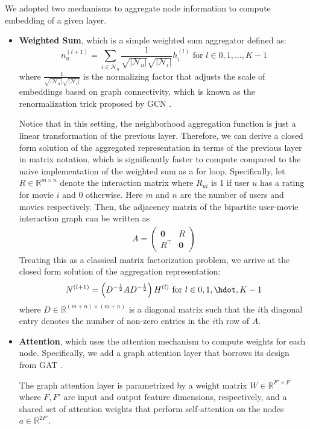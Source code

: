 \documentclass{article}
\begin{document}
We adopted two mechanisms to aggregate node information to compute embedding of a given layer. 
\begin{itemize}
    \item \textbf{Weighted Sum}, which is a simple weighted sum aggregator defined as: $$n_u^{(l+1)}=\sum_{i\in \mathcal{N}_u} \frac{1}{\sqrt{|\mathcal{N}_u|} \sqrt{|\mathcal{N}_i|}} h_i^{(l)} \text{ for } l \in 0, 1, \hdots, K - 1$$
    where $\frac{1}{\sqrt{|\mathcal{N}_u|} \sqrt{|\mathcal{N}_i|}}$ is the normalizing factor that adjusts the scale of embeddings based on graph connectivity, which is known as the renormalization trick proposed by GCN \cite{gcn}.

    Notice that in this setting, the neighborhood aggregation function is just a linear transformation of the previous layer. Therefore, we can derive a closed form solution of the aggregated representation in terms of the previous layer in matrix notation, which is significantly faster to compute compared to the naive implementation of the weighted sum as a for loop. Specifically, let $R \in \mathbb{R}^{m \times n}$ denote the interaction matrix where $R_{ui}$ is 1 if user $u$ has a rating for movie $i$ and 0 otherwise. Here $m$ and $n$ are the number of users and movies respectively. Then, the adjacency matrix of the bipartite user-movie interaction graph can be written as
    \begin{align*}
        A =
        \begin{pmatrix}
        \mathbf{0} & R \\
        R^\top & \mathbf{0}
        \end{pmatrix}
    \end{align*}
    Treating this as a classical matrix factorization problem, we arrive at the closed form solution of the aggregation representation:
    \begin{align*}
        N^{(l+1)} = \left( D^{-\frac{1}{2}} A D^{-\frac{1}{2}} \right) H^{(l)} \text{ for } l \in 0, 1, \hdot, K - 1
    \end{align*}
    where $D \in \mathbb{R}^{(m+n) \times (m+n)}$ is a diagonal matrix such that the $i$th diagonal entry denotes the number of non-zero entries in the $i$th row of $A$.
    
    \item \textbf{Attention}, which uses the attention mechanism to compute weights for each node. Specifically, we add a graph attention layer that borrows its design from GAT \cite{gat}. 
    
    The graph attention layer is parametrized by a weight matrix $W \in \mathbb{R}^{F' \times F}$ where $F, F'$ are input and output feature dimensions, respectively, and a shared set of attention weights that perform self-attention on the nodes $a \in \mathbb{R}^{2F'}$. 


\end{itemize}
\end{document}
